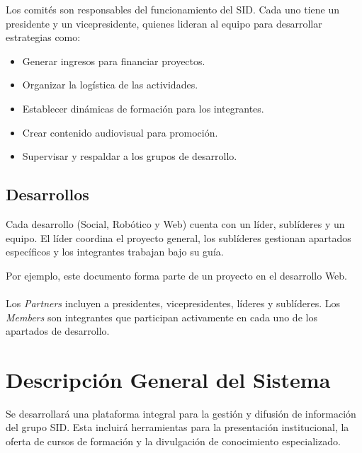 \documentclass[11pt,a4paper]{article}
\begin{document}
Los comités son responsables del funcionamiento del SID. Cada uno tiene un presidente y un vicepresidente,
quienes lideran al equipo para desarrollar estrategias como:

\begin{itemize}
	\item Generar ingresos para financiar proyectos.
	\item Organizar la logística de las actividades.
	\item Establecer dinámicas de formación para los integrantes.
	\item Crear contenido audiovisual para promoción.
	\item Supervisar y respaldar a los grupos de desarrollo.
\end{itemize}

\subsection{Desarrollos}

Cada desarrollo (Social, Robótico y Web) cuenta con un líder, sublíderes y un equipo.
El líder coordina el proyecto general, los sublíderes gestionan apartados específicos y los integrantes trabajan bajo su guía.

Por ejemplo, este documento forma parte de un proyecto en el desarrollo Web.

\paragraph{}
Los \textit{Partners} incluyen a presidentes, vicepresidentes, líderes y sublíderes. Los \textit{Members} son
integrantes que participan activamente en cada uno de los apartados de desarrollo.

\section{Descripción General del Sistema}
Se desarrollará una plataforma integral para la gestión y difusión de información del grupo SID. Esta incluirá herramientas para la presentación institucional, la oferta de cursos de formación y la divulgación de conocimiento especializado.
\end{document}
